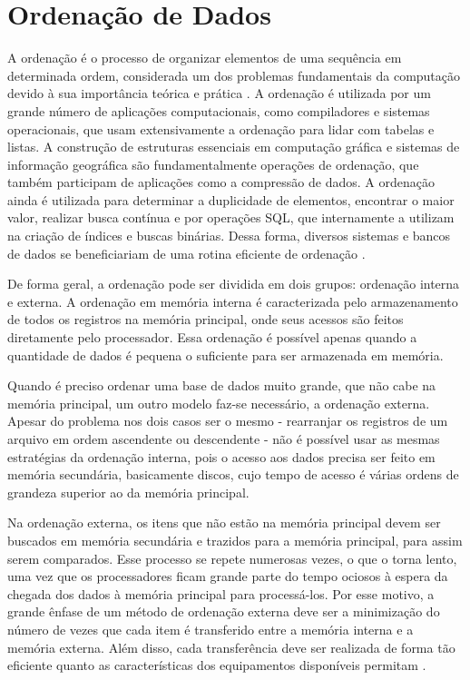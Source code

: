 %
%
\chapter{Ordenação de Dados}
\label{cap:ordenacao}


A ordenação é o processo de organizar elementos de uma sequência em determinada ordem, considerada um dos problemas fundamentais da computação devido à sua importância teórica e prática \cite{Knuth:1998, Cormen:2009}. 
A ordenação é utilizada por um grande número de aplicações computacionais, como compiladores e sistemas operacionais, que usam extensivamente a ordenação para lidar com tabelas e listas. 
A construção de estruturas essenciais em computação gráfica e sistemas de informação geográfica são fundamentalmente operações de ordenação, que também participam de aplicações como a compressão de dados. A ordenação ainda é utilizada para determinar a duplicidade de elementos, encontrar o maior valor, realizar busca contínua e por operações SQL, que internamente a utilizam na criação de índices e buscas binárias. Dessa forma, diversos sistemas e bancos de dados se beneficiariam de uma rotina eficiente de ordenação \cite{Lauterbach:2009,Satish:2009,Dean:2008}.


De forma geral, a ordenação pode ser dividida em dois grupos: ordenação interna e externa. 
A ordenação em memória interna é caracterizada pelo armazenamento de todos os registros na memória principal, onde seus acessos são feitos diretamente pelo processador. Essa ordenação é possível apenas quando a quantidade de dados é pequena o suficiente para ser armazenada em memória. 

Quando é preciso ordenar uma base de dados muito grande, que não cabe na memória principal, um outro modelo faz-se necessário, a ordenação externa.
Apesar do problema nos dois casos ser o mesmo - rearranjar os registros de um arquivo em ordem ascendente ou descendente - não é possível usar as mesmas estratégias da ordenação interna, pois o acesso aos dados precisa ser feito em memória secundária, basicamente discos, cujo tempo de acesso é várias ordens de grandeza superior ao da memória principal.  %

Na ordenação externa, os itens que não estão na memória principal devem ser buscados em memória secundária e trazidos para a memória principal, para assim serem comparados. Esse processo se repete numerosas vezes, o que o torna lento, uma vez que os processadores ficam grande parte do tempo ociosos à espera da chegada dos dados à memória principal para processá-los. Por esse motivo, a grande ênfase de um método de ordenação externa deve ser a minimização do número de vezes que cada item é transferido entre a memória interna e a memória externa. Além disso, cada transferência deve ser realizada de forma tão eficiente quanto as características dos equipamentos disponíveis permitam \cite{Ziviani:2007}.


